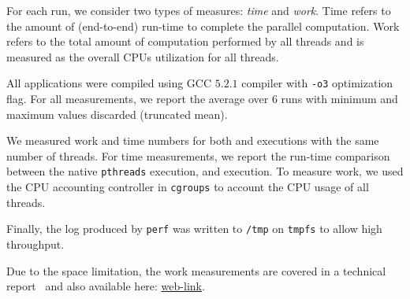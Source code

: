   For each run, we consider two types of measures: \emph{time} and
 {\em work}.  Time refers to the amount of (end-to-end)
run-time to complete the parallel computation.  Work refers to the total amount of
computation performed by all threads and is measured as the overall CPUs utilization for all threads.  



 All applications were compiled using
GCC $5.2.1$ compiler with {\tt -o3} optimization flag. For all
measurements, we report the average over $6$ runs with minimum and maximum values
discarded (truncated mean).

 We measured work and time numbers for both \pthreads and \projecttitle executions with the same number of threads. For time measurements, we report the run-time comparison between the native {\tt pthreads} execution, and \projecttitle execution.   To measure work, we used the CPU accounting controller in {\tt cgroups} to account the CPU usage of all threads. 

Finally, the log produced by
{\tt perf} was written to {\tt /tmp} on {\tt tmpfs} to allow high throughput.


  Due to the space limitation, the work measurements are covered in a technical report~\cite{inspector-techreport} and also available here: \href{https://mic92.github.io/inspector/index.html}{web-link}.




